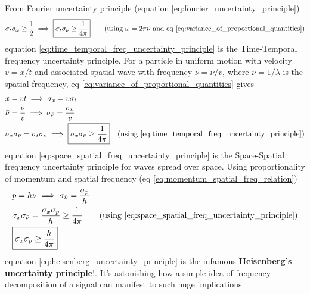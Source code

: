 \documentclass[11pt, a4paper]{article}
\newcommand{\eqrefnp}[1]{\textup{\ref{#1}}}
\newcommand{\stdev}[1]{\sigma_{#1}}
\begin{document}
From Fourier uncertainty principle (equation \eqrefnp{eq:fourier_uncertainty_principle})
\begin{equation}\label{eq:time_temporal_freq_uncertainty_principle}
	\stdev{t} \stdev{\omega} \geq \frac{1}{2} \implies \boxed{\stdev{t} \stdev{\nu} \geq \frac{1}{4\pi}} \qquad \text{(using $\omega = 2\pi \nu$ and eq \eqrefnp{eq:variance_of_proportional_quantities})}
\end{equation}
equation \eqref{eq:time_temporal_freq_uncertainty_principle} is the Time-Temporal frequency uncertainty principle. For a particle in uniform motion with velocity $v = x / t$ and associated spatial wave with frequency $\bar{\nu} = \nu / v$, where $\bar{\nu} = 1/\lambda$ is the spatial frequency, eq \eqref{eq:variance_of_proportional_quantities} gives
\begin{align}
 	& x = vt \implies \stdev{x} = v\stdev{t} \nonumber \\
 	& \bar{\nu} = \frac{\nu}{v} \implies \stdev{\bar{\nu}} = \frac{\stdev{\nu}}{v} \nonumber \\
 	& \stdev{x}\stdev{\bar{\nu}} = \stdev{t} \stdev{\nu} \implies \boxed{\stdev{x}\stdev{\bar{\nu}} \geq \frac{1}{4\pi}} \quad \text{(using \eqrefnp{eq:time_temporal_freq_uncertainty_principle})} \label{eq:space_spatial_freq_uncertainty_principle}
\end{align}
equation \eqref{eq:space_spatial_freq_uncertainty_principle} is the Space-Spatial frequency uncertainty principle for waves spread over space. Using proportionality of momentum and spatial frequency (eq \eqrefnp{eq:momentum_spatial_freq_relation})
\begin{align}
	& p = h \bar{\nu} \implies \stdev{\bar{\nu}} = \frac{\stdev{p}}{h}  \nonumber \\
	& \stdev{x}\stdev{\bar{\nu}} = \frac{\stdev{x}\stdev{p}}{h} \geq \frac{1}{4 \pi} \nonumber \tag{using \eqrefnp{eq:space_spatial_freq_uncertainty_principle}} \\
	& \boxed{\stdev{x}\stdev{p} \geq \frac{h}{4 \pi}} \label{eq:heisenberg_uncertainty_principle}
\end{align}
equation \eqref{eq:heisenberg_uncertainty_principle} is the infamous \textbf{Heisenberg's uncertainty principle}!. It's astonishing how a simple idea of frequency decomposition of a signal can manifest to such huge implications.
\end{document}
